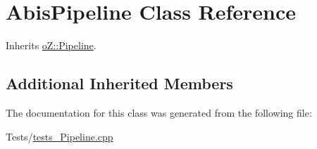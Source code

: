 \hypertarget{class_abis_pipeline}{}\section{Abis\+Pipeline Class Reference}
\label{class_abis_pipeline}


Inherits \mbox{\hyperlink{classo_z_1_1_pipeline}{o\+Z\+::\+Pipeline}}.

\subsection*{Additional Inherited Members}


The documentation for this class was generated from the following file\+:\begin{DoxyCompactItemize}
\item 
Tests/\mbox{\hyperlink{tests___pipeline_8cpp}{tests\+\_\+\+Pipeline.\+cpp}}\end{DoxyCompactItemize}
